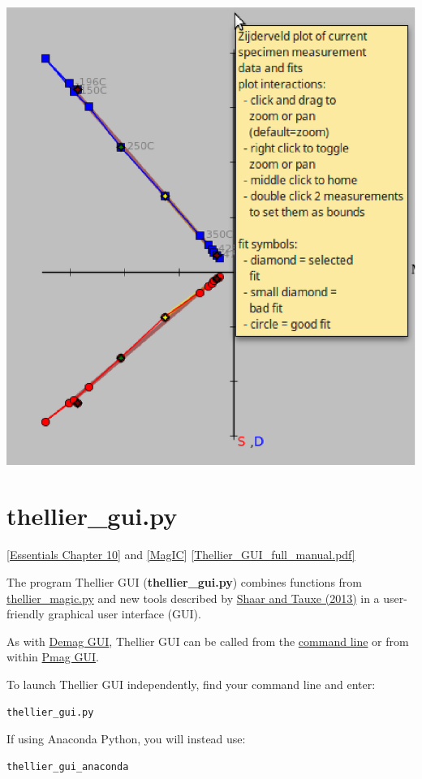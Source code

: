 \documentclass[11pt]{book}
\begin{document}
{{\includegraphics[width=10 cm]{EPSFiles/demag_gui_ContextHelp.eps}


\section{thellier\_gui.py}
\href{http://earthref.org/MAGIC/books/Tauxe/Essentials/WebBook3ch10.html#ch10}{[Essentials Chapter 10]} and \href{#MagIC}{[MagIC}]
\href{https://github.com/PmagPy/PmagPy-Cookbook/blob/gh-pages/thellier_GUI_full_manual.pdf}{[Thellier\_GUI\_full\_manual.pdf]}

The program Thellier GUI ({\bf thellier\_gui.py})  combines functions from \href{#thellier_magic.py}{thellier\_magic.py} and new tools described by  \href{http://dx.doi.org/10.1002/ggge.20062}{Shaar and Tauxe (2013)} \nocite{shaar13} in a user-friendly graphical user interface (GUI).

As with \href{#demag_gui.py}{Demag GUI}, Thellier GUI can  be called from  the  \href{#command_line}{command line} or from within \href{#pmag_gui.py}{Pmag GUI}.

To launch Thellier GUI independently, find your command line and enter:

\begin{verbatim}
thellier_gui.py
\end{verbatim}

If using Anaconda Python, you will instead use:

\begin{verbatim}
thellier_gui_anaconda
\end{verbatim}

}}
\end{document}
